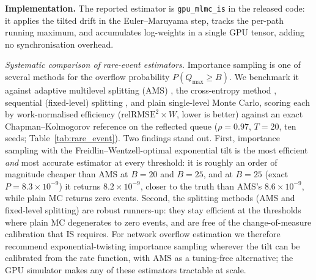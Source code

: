 \documentclass{ieeeaccess}
\begin{document}
\textbf{Implementation.} The reported estimator is \texttt{gpu\_mlmc\_is} in the released code: it
applies the tilted drift in the Euler--Maruyama step, tracks the per-path running maximum, and
accumulates log-weights in a single GPU tensor, adding no synchronisation overhead.

\textit{Systematic comparison of rare-event estimators.}
Importance sampling is one of several methods for the overflow probability
$P(Q_{\max}\geq B)$. We benchmark it against adaptive multilevel splitting (AMS)
\cite{cerou2007adaptive}, the cross-entropy method \cite{rubinstein2004cross}, sequential
(fixed-level) splitting \cite{del2004feynman}, and plain single-level Monte Carlo, scoring each
by work-normalised efficiency ($\mathrm{relRMSE}^2\times W$, lower is better) against an exact
Chapman--Kolmogorov reference on the reflected queue ($\rho{=}0.97$, $T{=}20$, ten seeds;
Table~\ref{tab:rare_event}). Two findings stand out. First, importance sampling with the
Freidlin--Wentzell-optimal exponential tilt is the most efficient \emph{and} most accurate
estimator at every threshold: it is roughly an order of magnitude cheaper than AMS at $B{=}20$ and
$B{=}25$, and at $B{=}25$ (exact $P{=}8.3\times10^{-9}$) it returns $8.2\times10^{-9}$, closer to
the truth than AMS's $8.6\times10^{-9}$, while plain MC returns zero events. Second, the
splitting methods (AMS and fixed-level splitting) are robust runners-up: they stay efficient at the
thresholds where plain MC degenerates to zero events, and are free of the change-of-measure
calibration that IS requires. For
network overflow estimation we therefore recommend exponential-twisting importance sampling wherever
the tilt can be calibrated from the rate function, with AMS as a tuning-free alternative; the GPU
simulator makes any of these estimators tractable at scale.
\end{document}
